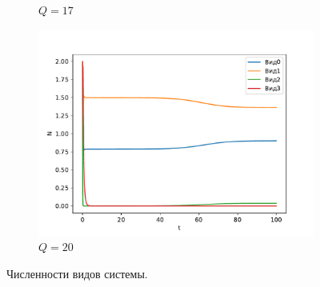 \begin{figure}[H]
\begin{subfigure}[t]{.3\linewidth}
            \caption{\(Q = 17\)}
        \end{subfigure}
        \begin{subfigure}[t]{.3\linewidth}
            \centering
            \includegraphics[width=\textwidth]{pictures/exp_flow/exp2_Q20.pdf}
            \caption{\(Q = 20\)}
        \end{subfigure}
        \caption{Численности видов системы.}  \label{fig:flow_exp2_q1}
    \end{figure}

